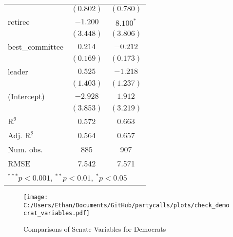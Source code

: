 \documentclass[12pt]{article}
\begin{document}
\begin{table}
\begin{center}
\begin{tabular}{l c c }
			& $(0.802)$      & $(0.780)$      \\
			retiree                  & $-1.200$       & $8.100^{*}$    \\
			& $(3.448)$      & $(3.806)$      \\
			best\_committee          & $0.214$        & $-0.212$       \\
			& $(0.169)$      & $(0.173)$      \\
			leader                   & $0.525$        & $-1.218$       \\
			& $(1.403)$      & $(1.237)$      \\
			(Intercept)              & $-2.928$       & $1.912$        \\
			& $(3.853)$      & $(3.219)$      \\
			\hline
			R$^2$                    & 0.572          & 0.663          \\
			Adj. R$^2$               & 0.564          & 0.657          \\
			Num. obs.                & 885            & 907            \\
			RMSE                     & 7.542          & 7.571          \\
			\hline
			\multicolumn{3}{l}{\scriptsize{$^{***}p<0.001$, $^{**}p<0.01$, $^*p<0.05$}}
		\end{tabular}
	\end{center}
\end{table}

\begin{figure}[h]
	\caption{Comparisons of Senate Variables for Democrats}
	\centering
	\texttt{[image: C:/Users/Ethan/Documents/GitHub/partycalls/plots/check\_democrat\_variables.pdf]}
	
\end{figure}
\end{document}

